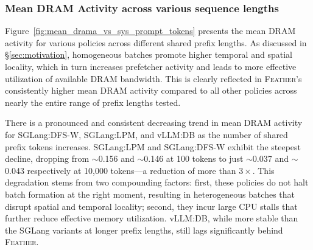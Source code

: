 \begin{table}[t]
\centering
\small
{}
\caption{Time taken by individual functions of Chunked Hash Tree for $5{,}000$ requests of $5{,}000$ tokens each.}
\label{tab:chunked_hash_tree_individual_functions}
\end{table}


\subsubsection*{Mean DRAM Activity across various sequence lengths}
Figure~\ref{fig:mean_drama_vs_sys_prompt_tokens} presents the mean DRAM activity for various policies across different shared prefix lengths. As discussed in \S\ref{sec:motivation}, homogeneous batches promote higher temporal and spatial locality, which in turn increases  prefetcher activity and leads to more effective utilization of available DRAM bandwidth. This is clearly reflected in \textsc{Feather}'s consistently higher mean DRAM activity compared to all other policies across nearly the entire range of prefix lengths tested.

There is a pronounced and consistent decreasing trend in mean DRAM activity for SGLang:DFS-W, SGLang:LPM, and vLLM:DB as the number of shared prefix tokens increases. SGLang:LPM and SGLang:DFS-W exhibit the steepest decline, dropping from $\sim$0.156 and $\sim$0.146 at 100 tokens to just $\sim$0.037 and $\sim$0.043 respectively at 10{,}000 tokens---a reduction of more than $3\times$. This degradation stems from two compounding factors: first, these policies do not halt batch formation at the right moment, resulting in heterogeneous batches that disrupt spatial and temporal locality; second, they incur large CPU stalls that further reduce effective memory utilization. vLLM:DB, while more stable than the SGLang variants at longer prefix lengths, still lags significantly behind \textsc{Feather}.

